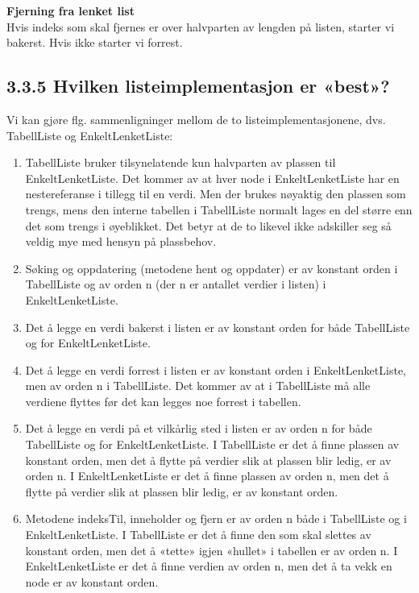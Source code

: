 \documentclass[11pt]{article}
\begin{document}
        \textbf{Fjerning fra lenket list} \\
        Hvis indeks som skal fjernes er over halvparten av lengden på listen,
        starter vi bakerst. Hvis ikke starter vi forrest.

\newpage

    \subsection{3.3.5 Hvilken listeimplementasjon er «best»?}
        Vi kan gjøre flg. sammenligninger mellom de to listeimplementasjonene, dvs. TabellListe og
        EnkeltLenketListe:
        \begin{enumerate}
            \item TabellListe bruker tilsynelatende kun halvparten av plassen til EnkeltLenketListe.
            Det kommer av at hver node i EnkeltLenketListe har en nestereferanse i tillegg til en
            verdi. Men der brukes nøyaktig den plassen som trengs, mens den interne tabellen i
            TabellListe normalt lages en del større enn det som trengs i øyeblikket. Det betyr at
            de to likevel ikke adskiller seg så veldig mye med hensyn på plassbehov.
            \item Søking og oppdatering (metodene hent og oppdater) er av konstant orden i
            TabellListe og av orden n (der n er antallet verdier i listen) i EnkeltLenketListe.
            \item Det å legge en verdi bakerst i listen er av konstant orden for både TabellListe og for
            EnkeltLenketListe.
            \item Det å legge en verdi forrest i listen er av konstant orden i EnkeltLenketListe, men av
            orden n i TabellListe. Det kommer av at i TabellListe må alle verdiene flyttes før det
            kan legges noe forrest i tabellen.
            \item Det å legge en verdi på et vilkårlig sted i listen er av orden n for både TabellListe og
            for EnkeltLenketListe. I TabellListe er det å finne plassen av konstant orden, men
            det å flytte på verdier slik at plassen blir ledig, er av orden n. I EnkeltLenketListe er
            det å finne plassen av orden n, men det å flytte på verdier slik at plassen blir ledig, er
            av konstant orden.
            \item Metodene indeksTil, inneholder og fjern er av orden n både i TabellListe og i
            EnkeltLenketListe. I TabellListe er det å finne den som skal slettes av konstant
            orden, men det å «tette» igjen «hullet» i tabellen er av orden n. I EnkeltLenketListe
            er det å finne verdien av orden n, men det å ta vekk en node er av konstant orden.
        \end{enumerate}
\end{document}
